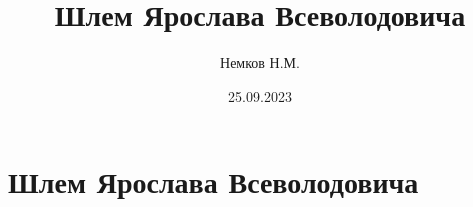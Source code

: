 
\title{Шлем Ярослава Всеволодовича}
\author{Немков Н.М.}
\date{25.09.2023}



\begin{frame}
\maketitle
\end{frame}

\section{Шлем Ярослава Всеволодовича}

